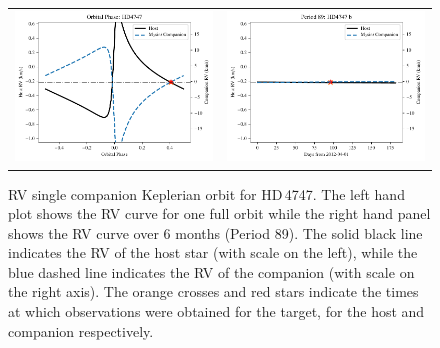 
\begin{figure}
    \centering
    \begin{tabular}{cc}
        \includegraphics[width=0.45\linewidth]{figures/direct-recovery/orbital-plots/HD4747_orbital_phase.pdf} & \includegraphics[width=0.45\linewidth]{figures/direct-recovery/orbital-plots/HD4747_p89.pdf}\\
    \end{tabular}
    \caption[]{RV single companion Keplerian orbit for {HD\,4747}.
        The left hand plot shows the RV curve for one full orbit while the right hand panel shows the RV curve over 6 months (Period 89).
        The solid black line indicates the RV of the host star (with scale on the left), while the blue dashed line indicates the RV of the companion (with scale on the right axis).
        The orange crosses and red stars indicate the times at which observations were obtained for the target, for the host and companion respectively.}
    \label{fig:hd4747p89}
\end{figure}

